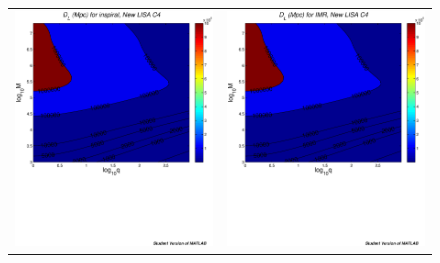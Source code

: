 \documentclass{iopart}
\begin{document}
\begin{figure}[H]
\begin{center}
\begin{tabular}{cc}
\includegraphics[scale=0.41,clip=true]{FigEmanuele/C4InspDLContour.ps}
&\includegraphics[scale=0.41,clip=true]{FigEmanuele/C4IMRDLContour.ps}\\

\end{tabular}
\end{center}
\end{figure}
\end{document}

